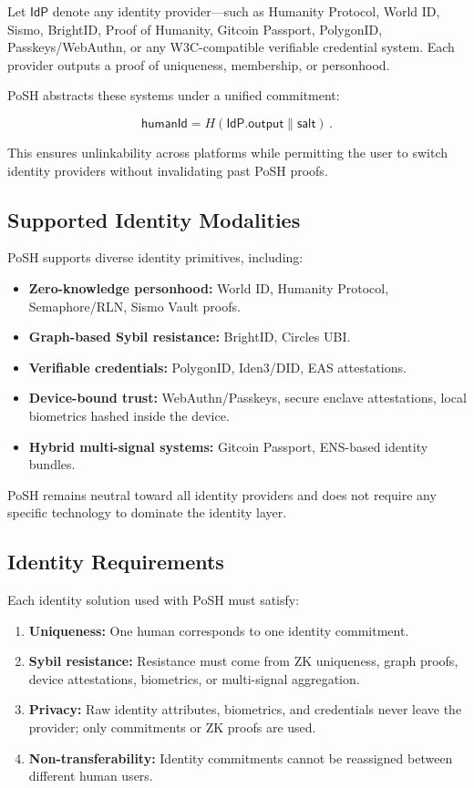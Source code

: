 \documentclass[11pt,a4paper]{report}
\theoremstyle{definition}
\theoremstyle{remark}
\begin{document}
Let $\textsf{IdP}$ denote any identity provider---such as Humanity Protocol,
World ID, Sismo, BrightID, Proof of Humanity, Gitcoin Passport, PolygonID,
Passkeys/WebAuthn, or any W3C-compatible verifiable credential system. Each
provider outputs a proof of uniqueness, membership, or personhood.

PoSH abstracts these systems under a unified commitment:

\[
\mathsf{humanId} = H(\textsf{IdP.output} \parallel \textsf{salt}) \, .
\]

This ensures unlinkability across platforms while permitting the user to switch
identity providers without invalidating past PoSH proofs.

\subsection{Supported Identity Modalities}

PoSH supports diverse identity primitives, including:

\begin{itemize}[leftmargin=*]
  \item \textbf{Zero-knowledge personhood:} World ID, Humanity Protocol,
        Semaphore/RLN, Sismo Vault proofs.
  \item \textbf{Graph-based Sybil resistance:} BrightID, Circles UBI.
  \item \textbf{Verifiable credentials:} PolygonID, Iden3/DID, EAS attestations.
  \item \textbf{Device-bound trust:} WebAuthn/Passkeys, secure enclave
        attestations, local biometrics hashed inside the device.
  \item \textbf{Hybrid multi-signal systems:} Gitcoin Passport, ENS-based
        identity bundles.
\end{itemize}

PoSH remains neutral toward all identity providers and does not require any
specific technology to dominate the identity layer.

\subsection{Identity Requirements}

Each identity solution used with PoSH must satisfy:

\begin{enumerate}[leftmargin=*]
  \item \textbf{Uniqueness:} One human corresponds to one identity commitment.
  \item \textbf{Sybil resistance:} Resistance must come from ZK uniqueness,
        graph proofs, device attestations, biometrics, or multi-signal
        aggregation.
  \item \textbf{Privacy:} Raw identity attributes, biometrics, and credentials
        never leave the provider; only commitments or ZK proofs are used.
  \item \textbf{Non-transferability:} Identity commitments cannot be reassigned
        between different human users.
\end{enumerate}
\end{document}
